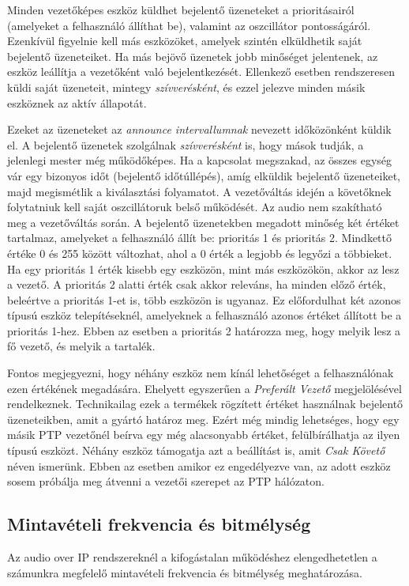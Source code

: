 Minden vezetőképes eszköz küldhet bejelentő üzeneteket a prioritásairól (amelyeket a felhasználó állíthat be),
valamint az oszcillátor pontosságáról. Ezenkívül figyelnie kell más eszközöket,
amelyek szintén elküldhetik saját bejelentő üzeneteiket. 
Ha más bejövő üzenetek jobb minőséget jelentenek, az eszköz leállítja a vezetőként való bejelentkezését.
Ellenkező esetben rendszeresen küldi saját üzeneteit, mintegy \textit{szívverésként},
és ezzel jelezve minden másik eszköznek az aktív állapotát. 

Ezeket az üzeneteket az \textit{announce intervallumnak} nevezett időközönként küldik el. 
A bejelentő üzenetek szolgálnak \textit{szívverésként} is, hogy mások tudják, a jelenlegi mester még működőképes.
Ha a kapcsolat megszakad, az összes egység vár egy bizonyos időt (bejelentő időtúllépés),
amíg elküldik bejelentő üzeneteiket, majd megismétlik a kiválasztási folyamatot. 
A vezetőváltás idején a követőknek folytatniuk kell saját oszcillátoruk belső működését.
Az audio nem szakítható meg a vezetőváltás során.
A bejelentő üzenetekben megadott minőség két értéket tartalmaz, amelyeket a felhasználó állít be: prioritás 1 és prioritás 2.
Mindkettő értéke 0 és 255 között változhat, ahol a 0 érték a legjobb és legyőzi a többieket.
Ha egy prioritás 1 érték kisebb egy eszközön, mint más eszközökön,
akkor az lesz a vezető. A prioritás 2 alatti érték csak akkor releváns, ha
minden előző érték, beleértve a prioritás 1-et is, több eszközön is ugyanaz. 
Ez előfordulhat két azonos típusú eszköz telepítéseknél, amelyeknek a felhasználó
azonos értéket állított be a prioritás 1-hez. Ebben az esetben a prioritás 2
határozza meg, hogy melyik lesz a fő vezető, és melyik a tartalék. 

Fontos megjegyezni, hogy néhány eszköz nem kínál lehetőséget a felhasználónak ezen értékének megadására.
Ehelyett egyszerűen a \textit{Preferált Vezető} megjelölésével rendelkeznek.
Technikailag ezek a termékek rögzített értéket használnak bejelentő üzeneteikben, amit a gyártó határoz meg.
Ezért még mindig lehetséges, hogy egy másik PTP vezetőnél beírva egy még alacsonyabb értéket, felülbírálhatja az ilyen típusú eszközt.
Néhány eszköz támogatja azt a beállítást is, amit \textit{Csak Követő} néven ismerünk. Ebben az esetben amikor ez engedélyezve van,
az adott eszköz sosem próbálja meg átvenni a vezetői szerepet az PTP hálózaton.
\subsection{Mintavételi frekvencia és bitmélység}
Az audio over IP rendszereknél a kifogástalan működéshez elengedhetetlen a számunkra
megfelelő mintavételi frekvencia és bitmélység meghatározása.

